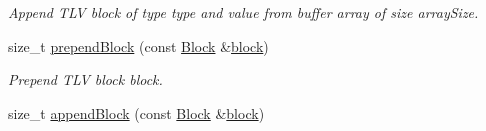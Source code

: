 \begin{DoxyCompactItemize}
\begin{DoxyCompactList}\small\item\em Append T\+LV block of type {\ttfamily type} and value from buffer {\ttfamily array} of size {\ttfamily array\+Size}. \end{DoxyCompactList}\item 
size\+\_\+t \hyperlink{classndn_1_1encoding_1_1Encoder_af847018c1d27f58dfd1c531be97366e7}{prepend\+Block} (const \hyperlink{classndn_1_1Block}{Block} \&\hyperlink{classndn_1_1encoding_1_1Encoder_a37a3f9744f1fe2be7b35a5fd7827bd3b}{block})\hypertarget{classndn_1_1encoding_1_1Encoder_af847018c1d27f58dfd1c531be97366e7}{}\label{classndn_1_1encoding_1_1Encoder_af847018c1d27f58dfd1c531be97366e7}

\begin{DoxyCompactList}\small\item\em Prepend T\+LV block {\ttfamily block}. \end{DoxyCompactList}\item 
size\+\_\+t \hyperlink{classndn_1_1encoding_1_1Encoder_ab87232010aadf291f642847d07f20f8e}{append\+Block} (const \hyperlink{classndn_1_1Block}{Block} \&\hyperlink{classndn_1_1encoding_1_1Encoder_a37a3f9744f1fe2be7b35a5fd7827bd3b}{block})\hypertarget{classndn_1_1encoding_1_1Encoder_ab87232010aadf291f642847d07f20f8e}{}\label{classndn_1_1encoding_1_1Encoder_ab87232010aadf291f642847d07f20f8e}


\end{DoxyCompactItemize}
